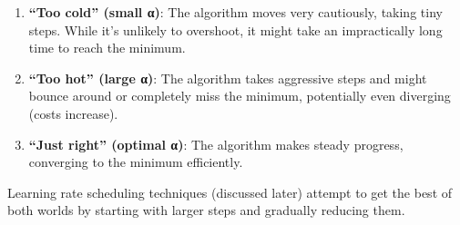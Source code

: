 \documentclass[
  letterpaper,
  DIV=11,
  numbers=noendperiod]{scrreprt}
\providecommand{\tightlist}{%
  \setlength{\itemsep}{0pt}\setlength{\parskip}{0pt}}\usepackage{longtable,booktabs,array}
\begin{document}
\begin{enumerate}
\def\labelenumi{\arabic{enumi}.}
\tightlist
\item
  \textbf{``Too cold'' (small α)}: The algorithm moves very cautiously,
  taking tiny steps. While it's unlikely to overshoot, it might take an
  impractically long time to reach the minimum.
\item
  \textbf{``Too hot'' (large α)}: The algorithm takes aggressive steps
  and might bounce around or completely miss the minimum, potentially
  even diverging (costs increase).
\item
  \textbf{``Just right'' (optimal α)}: The algorithm makes steady
  progress, converging to the minimum efficiently.
\end{enumerate}

Learning rate scheduling techniques (discussed later) attempt to get the
best of both worlds by starting with larger steps and gradually reducing
them.
\end{document}
